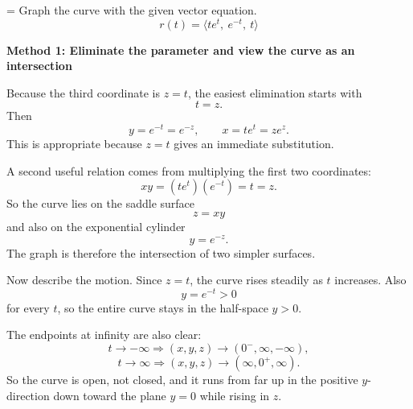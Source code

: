 \documentclass[a4paper,12pt,twocolumn]{article}
\newlength{\problemnumberwidth}
\newenvironment{solutionbox}{\begin{framed}}{\end{framed}}
\newcommand{\problem}[3]{%
  \Needspace{10\baselineskip}%
  \phantomsection\label{#1}%
  \par\vspace{0.8em}%
  \noindent
  \hangindent=\problemnumberwidth
  \hangafter=1
  \makebox[\problemnumberwidth][l]{\textbf{#2.}}#3\par
}
\begin{document}
\problem{prob:13-1-42}{42}{Graph the curve with the given vector equation.
\[
r(t)=\langle te^t,\ e^{-t},\ t\rangle
\]}

\begin{solutionbox}
\textbf{Method 1: Eliminate the parameter and view the curve as an intersection}

\begin{steps}
\item Because the third coordinate is \(z=t\), the easiest elimination starts with
\[
t=z.
\]
Then
\[
y=e^{-t}=e^{-z},
\qquad
x=te^t=ze^z.
\]
This is appropriate because \(z=t\) gives an immediate substitution.

\item A second useful relation comes from multiplying the first two coordinates:
\[
xy=(te^t)(e^{-t})=t=z.
\]
So the curve lies on the saddle surface
\[
z=xy
\]
and also on the exponential cylinder
\[
y=e^{-z}.
\]
The graph is therefore the intersection of two simpler surfaces.

\item Now describe the motion. Since \(z=t\), the curve rises steadily as \(t\) increases. Also
\[
y=e^{-t}>0
\]
for every \(t\), so the entire curve stays in the half-space \(y>0\).

\item The endpoints at infinity are also clear:
\[
t\to-\infty \Rightarrow (x,y,z)\to(0^{-},\infty,-\infty),
\]
\[
t\to\infty \Rightarrow (x,y,z)\to(\infty,0^{+},\infty).
\]
So the curve is open, not closed, and it runs from far up in the positive \(y\)-direction down toward the plane \(y=0\) while rising in \(z\).
\end{steps}
\end{solutionbox}
\end{document}

